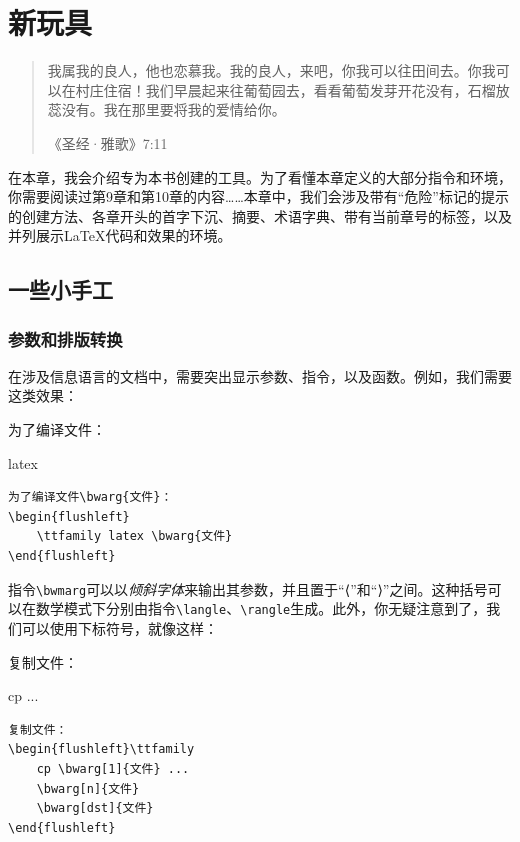 \chapter{新玩具}

\begin{quote}
    我属我的良人，他也恋慕我。我的良人，来吧，你我可以往田间去。你我可以在村庄住宿！我们早晨起来往葡萄园去，看看葡萄发芽开花没有，石榴放蕊没有。我在那里要将我的爱情给你。

    \hfill《圣经·雅歌》7:11
\end{quote}

在本章，我会介绍专为本书创建的工具。为了看懂本章定义的大部分指令和环境，你需要阅读过第9章和第10章的内容……本章中，我们会涉及带有“危险”标记的提示的创建方法、各章开头的首字下沉、摘要、术语字典、带有当前章号的标签，以及并列展示\LaTeX 代码和效果的环境。

\section{一些小手工}

\subsection{参数和排版转换}

在涉及信息语言的文档中，需要突出显示参数、指令，以及函数。例如，我们需要这类效果：

\begin{codelist}[11.1]{
    为了编译文件：
\begin{flushleft}
    \ttfamily latex 
\end{flushleft}
}
\begin{verbatim}
为了编译文件\bwarg{文件}：
\begin{flushleft}
    \ttfamily latex \bwarg{文件}
\end{flushleft}\end{verbatim}
\end{codelist}

指令\verb|\bwmarg|可以以\textsl{倾斜字体}来输出其参数，并且置于“⟨”和“⟩”之间。这种括号可以在数学模式下分别由指令\verb|\langle|、\verb|\rangle|生成。此外，你无疑注意到了，我们可以使用下标符号，就像这样：

\begin{codelist}[11.2]{
复制文件：
\begin{flushleft}\ttfamily
    cp  ...
\end{flushleft} 
}
\begin{verbatim}
复制文件：
\begin{flushleft}\ttfamily
    cp \bwarg[1]{文件} ...
    \bwarg[n]{文件}
    \bwarg[dst]{文件}
\end{flushleft}\end{verbatim}
\end{codelist}

